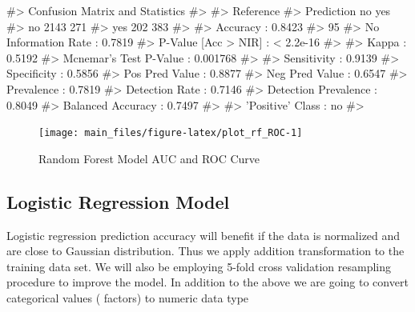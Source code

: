 \begin{Schunk}
\begin{Soutput}
#> Confusion Matrix and Statistics
#> 
#>           Reference
#> Prediction   no  yes
#>        no  2143  271
#>        yes  202  383
#>                                           
#>                Accuracy : 0.8423          
#>                  95%
#>     No Information Rate : 0.7819          
#>     P-Value [Acc > NIR] : < 2.2e-16       
#>                                           
#>                   Kappa : 0.5192          
#>  Mcnemar's Test P-Value : 0.001768        
#>                                           
#>             Sensitivity : 0.9139          
#>             Specificity : 0.5856          
#>          Pos Pred Value : 0.8877          
#>          Neg Pred Value : 0.6547          
#>              Prevalence : 0.7819          
#>          Detection Rate : 0.7146          
#>    Detection Prevalence : 0.8049          
#>       Balanced Accuracy : 0.7497          
#>                                           
#>        'Positive' Class : no              
#> 
\end{Soutput}
\end{Schunk}

\begin{Schunk}
\begin{figure}[H]

{\centering \texttt{[image: main\_files/figure-latex/plot\_rf\_ROC-1]} 

}

\caption[Random Forest Model AUC and ROC Curve]{Random Forest Model AUC and ROC Curve}\label{fig:plot_rf_ROC}
\end{figure}
\end{Schunk}

\hypertarget{logistic-regression-model}{%
\subsection{Logistic Regression Model}\label{logistic-regression-model}}

Logistic regression prediction accuracy will benefit if the data is
normalized and are close to Gaussian distribution. Thus we apply
addition transformation to the training data set. We will also be
employing 5-fold cross validation resampling procedure to improve the
model. In addition to the above we are going to convert categorical
values ( factors) to numeric data type

